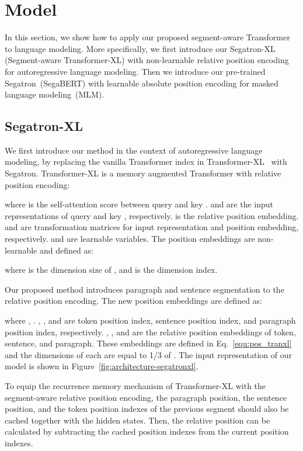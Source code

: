 \documentclass[letterpaper]{article}
\begin{document}
 \section{Model}
In this section, we show how to apply our proposed segment-aware Transformer to language modeling. More specifically, we first introduce our Segatron-XL (Segment-aware Transformer-XL) with non-learnable relative position encoding for autoregressive language modeling. 
Then we introduce our pre-trained Segatron~(SegaBERT) with learnable absolute position encoding for masked language modeling~(MLM).

\subsection{Segatron-XL}
We first introduce our method in the context of autoregressive language modeling, by replacing the vanilla Transformer index in  Transformer-XL~\citep{DBLP:conf/acl/DaiYYCLS19} with Segatron.
Transformer-XL is a memory augmented Transformer with relative position encoding: 
 
where  is the self-attention score between query  and key . 
 and  are the input representations of query  and key , respectively. 
 is the relative position embedding. 
 and  are transformation matrices for input representation and position embedding, respectively. 
 and   are learnable variables.
The position embeddings are non-learnable and defined as:
 
where  is the dimension size of , and  is the dimension index. 

Our proposed method introduces paragraph and sentence segmentation to the relative position encoding. The new position embeddings  are defined as:
 
where , . 
, , and  are token position index, sentence position index, and paragraph position index, respectively. 
, , and  are the relative position embeddings of token, sentence, and paragraph. 
These embeddings are defined in Eq.~\ref{equ:pos_tranxl} and the dimensions of each are equal to 1/3 of .
The input representation of our model is shown in Figure~\ref{fig:architecture-segatronxl}.

To equip the recurrence memory mechanism of Transformer-XL with the segment-aware relative position encoding, the paragraph position, the sentence position, and the token position indexes of the previous segment should also be cached together with the hidden states. Then, the relative position can be calculated by subtracting the cached position indexes from the current position indexes.
\end{document}
